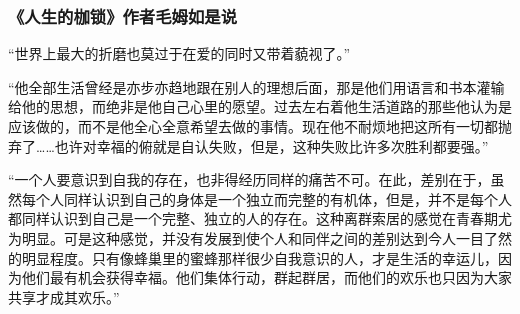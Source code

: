 \subsubsection*{《人生的枷锁》作者毛姆如是说}

“世界上最大的折磨也莫过于在爱的同时又带着藐视了。”
\par

“他全部生活曾经是亦步亦趋地跟在别人的理想后面，那是他们用语言和书本灌输给他的思想，而绝非是他自己心里的愿望。过去左右着他生活道路的那些他认为是应该做的，而不是他全心全意希望去做的事情。现在他不耐烦地把这所有一切都抛弃了……也许对幸福的俯就是自认失败，但是，这种失败比许多次胜利都要强。”
\par

“一个人要意识到自我的存在，也非得经历同样的痛苦不可。在此，差别在于，虽然每个人同样认识到自己的身体是一个独立而完整的有机体，但是，并不是每个人都同样认识到自己是一个完整、独立的人的存在。这种离群索居的感觉在青春期尤为明显。可是这种感觉，并没有发展到使个人和同伴之间的差别达到今人一目了然的明显程度。只有像蜂巢里的蜜蜂那样很少自我意识的人，才是生活的幸运儿，因为他们最有机会获得幸福。他们集体行动，群起群居，而他们的欢乐也只因为大家共享才成其欢乐。”
\par
